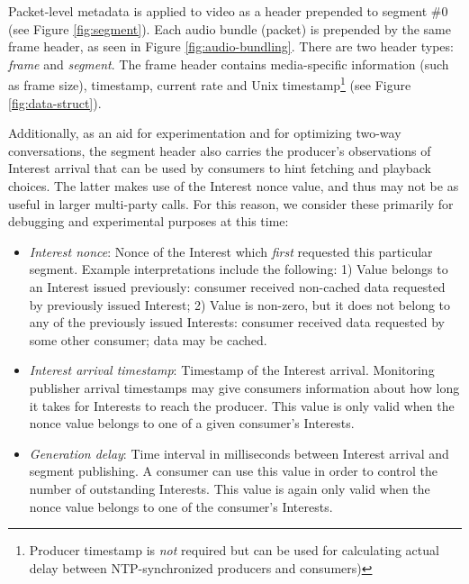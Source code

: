 \documentclass{icn/sig-alternate-2013} %
\begin{document}

Packet-level metadata is applied to video as a header prepended to segment \#0 (see Figure \ref{fig:segment}). Each audio bundle (packet) is prepended by the same frame header, as seen in Figure \ref{fig:audio-bundling}. There are two header types: \textit{frame} and \textit{segment}. The frame header contains media-specific information (such as frame size), timestamp, current rate and Unix timestamp\footnote{Producer timestamp is \textit{not} required but can be used for calculating actual delay between NTP-synchronized producers and consumers)} (see Figure \ref{fig:data-struct}).

Additionally, as an aid for experimentation and for optimizing two-way conversations, the segment header also carries the producer's observations of Interest arrival that can be used by consumers to hint fetching and playback choices.  The latter makes use of the Interest nonce value, and thus may not be as useful in larger multi-party calls. For this reason, we consider these primarily for debugging and experimental purposes at this time:
\begin{itemize} [label={}]
\item \textit{Interest nonce}: Nonce of the Interest which \textit{first} requested this particular segment. Example interpretations include the following:  1) Value belongs to an Interest issued previously: consumer received non-cached data requested by previously issued Interest; 2) Value is non-zero, but it does not belong to any of the previously issued Interests:  consumer received data requested by some other consumer; data may be cached.
\item \textit{Interest arrival timestamp}: Timestamp of the Interest arrival. Monitoring publisher arrival timestamps may give consumers information about how long it takes for Interests to reach the producer. This value is only valid when the nonce value belongs to one of a given consumer's Interests.
\item \textit{Generation delay}: Time interval in milliseconds between Interest arrival and segment publishing. A consumer can use this value in order to control the number of outstanding Interests. This value is again only valid when the nonce value belongs to one of the consumer's Interests.
\end{itemize}
\end{document}
